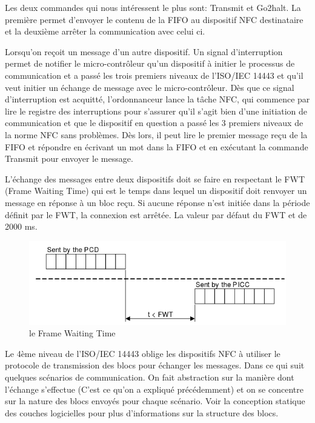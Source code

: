 \documentclass{themeensg}
\begin{document}
Les deux commandes qui nous intéressent le plus sont: Transmit et Go2halt. La première permet d'envoyer le contenu de la FIFO au dispositif NFC destinataire et la deuxième arrêter la communication avec celui ci.

Lorsqu'on reçoit un message d'un autre dispositif. Un signal d'interruption permet de notifier le micro-contrôleur qu'un dispositif à initier le processus de communication et a passé les trois premiers niveaux de l'ISO/IEC 14443 et qu'il veut initier un échange de message avec le micro-contrôleur. Dès que ce signal d'interruption est acquitté, l'ordonnanceur lance la tâche NFC, qui commence par lire le registre des interruptions pour s'assurer qu'il s'agit bien d'une initiation de communication et que le dispositif en question a passé les 3 premiers niveaux de la norme NFC sans problèmes. Dès lors, il peut lire le premier message reçu de la FIFO et répondre en écrivant un mot dans la FIFO et en exécutant la commande Transmit pour envoyer le message.

L'échange des messages entre deux dispositifs doit se faire en respectant le FWT (Frame Waiting Time) qui est le temps dans lequel un dispositif doit renvoyer un message en réponse à un bloc reçu. Si aucune réponse n'est initiée dans la période définit par le FWT, la connexion est arrêtée. La valeur par défaut du FWT et de 2000 ms.

\begin{figure}[h!]
\centering
\includegraphics[scale=0.65]{images/fwt.png}
\caption{le Frame Waiting Time}
\end{figure}

Le 4ème niveau de l'ISO/IEC 14443 oblige les dispositifs NFC à utiliser le protocole de transmission des blocs pour échanger les messages. Dans ce qui suit quelques scénarios de communication. On fait abstraction sur la manière dont l'échange s'effectue (C'est ce qu'on a expliqué précédemment) et on se concentre sur la nature des blocs envoyés pour chaque scénario. Voir la conception statique des couches logicielles pour plus d'informations sur la structure des blocs.
\end{document}
